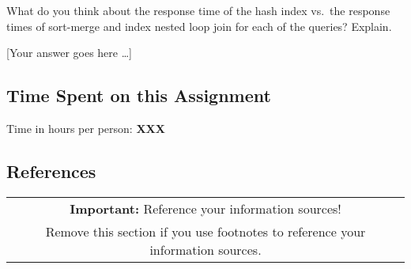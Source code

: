 \documentclass[11pt]{scrartcl}
\newcommand{\youranswerhere}{[Your answer goes here \ldots]}
\begin{document}
What do you think about the response time of the hash index vs.\ the response times of sort-merge and index nested loop join for each of the queries? Explain.

\youranswerhere{}

\subsection*{Time Spent on this Assignment}

Time in hours per person: \textbf{XXX}

\subsection*{References}

\begin{table}[H]
  \centering
  \begin{tabular}{c}
    \hline
    \textbf{Important:} Reference your information sources! \tabularnewline
    Remove this section if you use footnotes to reference your information
    sources. \tabularnewline
    \hline
  \end{tabular}
\end{table}
\end{document}
